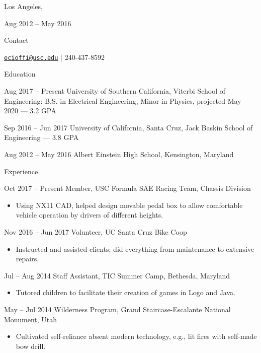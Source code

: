 \documentclass[11pt, letterpaper]{article}
\renewcommand*{\cvlabelfont}{\conds} %
\newcommand{\compactspacing}{\setlength{\itemsep}{-0.35em}} %
\newcommand{\describe}[1] {
    \begin{itemize}[label=---, topsep=-0.5em, itemindent=0em, labelsep=0.5em, leftmargin=2em]
    \small
    \item#1
    \end{itemize}
}
\begin{document}
\thispagestyle{empty} %

\begin{cv}{\color{blue}{Eric A. Cioffi}} %
\setlength{\cvlabelskip}{0.75em} %
\cvplace{} %
\noindent Los Angeles, \datemod

\settowidth{\cvlabelwidth} {\cvlabelfont Aug 2012 – May 2016} 
\begin{cvlist}{Contact}
    \item \href{mailto:ecioffi@usc.edu}{\nolinkurl{ecioffi@usc.edu}}
    $\mid$ 240-437-8592
\end{cvlist}

\begin{cvlist}{Education}
    \compactspacing
    
    \item[Aug 2017 – Present] University of Southern California, Viterbi School of Engineering:
    B.S. in Electrical Engineering, Minor in Physics, projected May 2020 --- 3.2 GPA
    \item[Sep 2016 – Jun 2017] University of California, Santa Cruz, Jack Baskin School of Engineering --- 3.8 GPA
    \item[Aug 2012 – May 2016] Albert Einstein High School, Kensington, Maryland
\end{cvlist}

\begin{cvlist}{Experience}
    \compactspacing

    \item[Oct 2017 – Present] Member, USC Formula SAE Racing Team, Chassis Division
    \describe{Using NX11 CAD, helped design movable pedal box to allow comfortable vehicle operation by drivers of different heights.}
    
    \item[Nov 2016 – Jun 2017] Volunteer, UC Santa Cruz Bike Coop
    \describe{Instructed and assisted clients; did everything from maintenance to extensive repairs.}
    
    \item[Jul – Aug 2014] Staff Assistant, TIC Summer Camp, Bethesda, Maryland
    \describe{Tutored children to facilitate their creation of games in Logo and Java.}
    
    \item[May – Jul 2014] Wilderness Program, Grand Staircase-Escalante National Monument, Utah
    \describe{Cultivated self-reliance absent modern technology, e.g., lit fires with self-made bow drill.}
\end{cvlist}


\end{cv}
\end{document}
